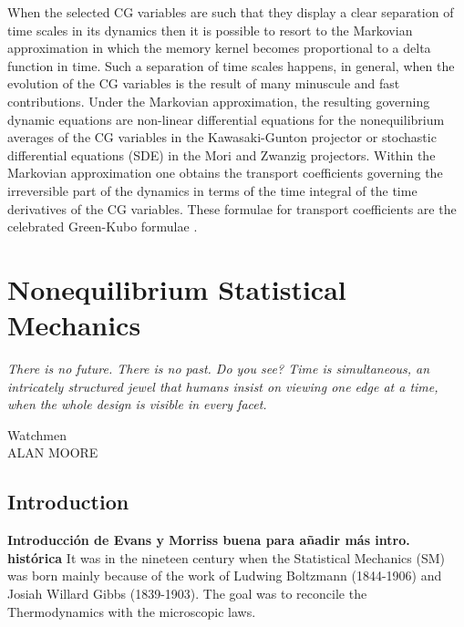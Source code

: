 \documentclass[a4paper,openright,12pt]{book}
\newcommand{\Note}[1]{{\bf \color{red}#1}}    %
\begin{document}
When the  selected CG  variables are  such that  they display  a clear
separation  of time  scales in  its dynamics  then it  is possible  to
resort  to the  Markovian  approximation in  which  the memory  kernel
becomes proportional to  a delta function in time.   Such a separation
of  time scales  happens, in  general, when  the evolution  of the  CG
variables  is the  result of  many minuscule  and fast  contributions.
Under  the Markovian  approximation, the  resulting governing  dynamic
equations    are   non-linear    differential   equations    for   the
nonequilibrium averages  of the  CG variables in  the Kawasaki-Gunton
projector or stochastic  differential equations (SDE) in  the Mori and
Zwanzig projectors.   Within the  Markovian approximation  one obtains
the  transport coefficients  governing  the irreversible  part of  the
dynamics in terms of the time  integral of the time derivatives of the
CG  variables.   These formulae  for  transport  coefficients are  the
celebrated Green-Kubo formulae \cite{Green1952,Kubo1957}.




\chapter{Nonequilibrium Statistical Mechanics}\label{Chap:NESM}
\epigraph{\textit{There is no future. There is no past. Do you see? Time is simultaneous, an intricately structured jewel that humans insist on viewing one edge at a time, when the whole design is visible in every facet.}}{Watchmen \\ ALAN MOORE} 

\section{Introduction}
\Note{Introducción de Evans y Morriss buena para añadir más intro. histórica}
It was in the nineteen century when the Statistical Mechanics (SM) was born mainly because of the work of Ludwing Boltzmann (1844-1906) and Josiah Willard Gibbs (1839-1903). The goal was to reconcile the Thermodynamics with the microscopic laws. 
\end{document}

